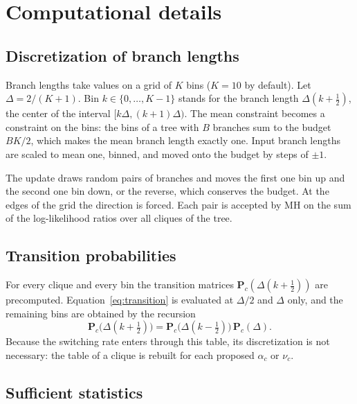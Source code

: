 \documentclass[
11pt, %
oneside, %
english, %
singlespacing, %
headsepline, %
chapterinoneline, %
]{MastersDoctoralThesis} %
\def\bP{\boldsymbol{P}}
\begin{document}
\appendix %

\chapter{Computational details}

\section{Discretization of branch lengths}\label{sec:branch-lengths}

Branch lengths take values on a grid of $K$ bins ($K=10$ by default). Let $\Delta = 2/(K+1)$. Bin $k \in \{0, \ldots, K-1\}$ stands for the branch length $\Delta(k + \tfrac12)$, the center of the interval $[k\Delta, (k+1)\Delta)$. The mean constraint becomes a constraint on the bins: the bins of a tree with $B$ branches sum to the budget $BK/2$, which makes the mean branch length exactly one. Input branch lengths are scaled to mean one, binned, and moved onto the budget by steps of $\pm 1$.

The update draws random pairs of branches and moves the first one bin up and the second one bin down, or the reverse, which conserves the budget. At the edges of the grid the direction is forced. Each pair is accepted by MH on the sum of the log-likelihood ratios over all cliques of the tree.

\section{Transition probabilities}

For every clique and every bin the transition matrices $\bP_c(\Delta(k+\tfrac12))$ are precomputed. Equation~\eqref{eq:transition} is evaluated at $\Delta/2$ and $\Delta$ only, and the remaining bins are obtained by the recursion
\begin{equation*}
	\bP_c\big(\Delta(k + \tfrac12)\big) = \bP_c\big(\Delta(k - \tfrac12)\big)\, \bP_c(\Delta).
\end{equation*}
Because the switching rate enters through this table, its discretization is not necessary: the table of a clique is rebuilt for each proposed $\alpha_c$ or $\nu_c$.

\section{Sufficient statistics}
\end{document}
